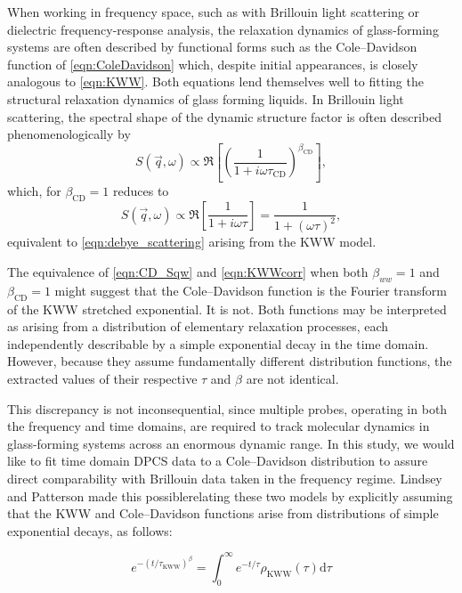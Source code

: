 When working in frequency space, such as with Brillouin light scattering or dielectric frequency-response analysis, the relaxation dynamics of glass-forming systems are often described by functional forms such as the Cole--Davidson function of \eqn \ref{eqn:ColeDavidson} which, despite initial appearances, is closely analogous to \eqn \ref{eqn:KWW}. Both equations lend themselves well to fitting the structural relaxation dynamics of glass forming liquids.  In Brillouin light scattering, the spectral shape of the dynamic structure factor is often described phenomenologically by
\begin{equation}
	S(\vec q,\omega) \propto \Re\!\left[
	\left( \frac{1}{1 + i \omega \tau_{\mathrm{CD}}} \right)^{\beta_{\mathrm{CD}}}
	\right],
	\label{eqn:CD_Sqw}
\end{equation}
\noindent which, for $\beta_{\mathrm{CD}}=1$ reduces to 
\begin{equation}
	S(\vec q,\omega) \propto
	\Re\!\left[
	\frac{1}{1 + i \omega \tau}
	\right]
	=
	\frac{1}{1 + (\omega \tau)^2},
	\label{eqn:AlsoDebye}
\end{equation}
\noindent equivalent to \eqn \ref{eqn:debye_scattering} arising from the KWW model.

The equivalence of \eqn \ref{eqn:CD_Sqw} and \eqn \ref{eqn:KWWcorr} when both $\beta_{ww}=1$ and $\beta_{\mathrm{CD}}=1$ might suggest that the Cole--Davidson function is the Fourier transform of the KWW stretched exponential. It is not. Both functions may be interpreted as arising from a distribution of elementary relaxation processes, each independently describable by a simple exponential decay in the time domain. However, because they assume fundamentally different distribution functions, the extracted values of their respective $\tau$ and $\beta$ are not identical.

This discrepancy is not inconsequential, since multiple probes, operating in both the frequency and time domains, are required to track molecular dynamics in glass-forming systems across an enormous dynamic range. In this study, we would like to fit time domain DPCS data to a Cole--Davidson distribution to assure direct comparability with Brillouin data taken in the frequency regime. Lindsey and Patterson made this possible\nolinebreak\cite{Lindsey}\textemdash relating these two models by explicitly assuming that the KWW and Cole--Davidson functions arise from distributions of simple exponential decays, as follows:

\begin{equation}e^{-(t/\tau_{\mathrm{KWW}})^{\beta}}= \int_{0}^{\infty} e^{-t/\tau}\rho_{\mathrm{KWW}}(\tau)\mathrm{d}\tau
\end{equation}


